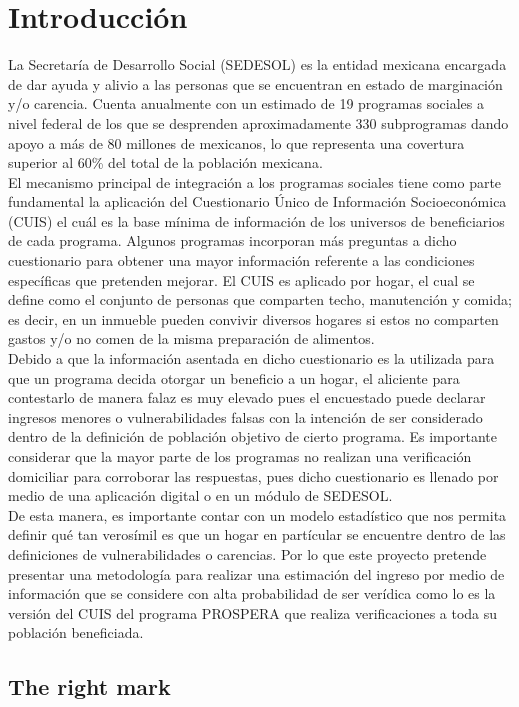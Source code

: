 \chapter{Introducción}
La Secretaría de Desarrollo Social (SEDESOL) es la entidad mexicana encargada de dar ayuda y alivio a las personas que se encuentran en estado de marginación y/o carencia. Cuenta anualmente con un estimado de 19 programas sociales a nivel federal de los que se desprenden aproximadamente 330 subprogramas dando apoyo a más de 80 millones de mexicanos, lo que representa una covertura superior al 60\% del total de la población mexicana.\\
El mecanismo principal de integración a los programas sociales tiene como parte fundamental la aplicación del Cuestionario Único de Información Socioeconómica (CUIS) el cuál es la base mínima de información de los universos de beneficiarios de cada programa. Algunos programas incorporan más preguntas a dicho cuestionario para obtener una mayor información referente a las condiciones específicas que pretenden mejorar. El CUIS es aplicado por hogar, el cual se define como el conjunto de personas que comparten techo, manutención y comida; es decir, en un inmueble pueden convivir diversos hogares si estos no comparten gastos y/o no comen de la misma preparación de alimentos.\\
Debido a que la información asentada en dicho cuestionario es la utilizada para que un programa decida otorgar un beneficio a un hogar, el aliciente para contestarlo de manera falaz es muy elevado pues el encuestado puede declarar ingresos menores o vulnerabilidades falsas con la intención de ser considerado dentro de la definición de población objetivo de cierto programa. Es importante considerar que la mayor parte de los programas no realizan una verificación domiciliar para corroborar las respuestas, pues dicho cuestionario es llenado por medio de una aplicación digital o en un módulo de SEDESOL.\\
De esta manera, es importante contar con un modelo estadístico que nos permita definir qué tan verosímil es que un hogar en partícular se encuentre dentro de las definiciones de vulnerabilidades o carencias. Por lo que este proyecto pretende presentar una metodología para realizar una estimación del ingreso por medio de información que se considere con alta probabilidad de ser verídica como lo es la versión del CUIS del programa PROSPERA que realiza verificaciones a toda su población beneficiada.

\section{The right mark}

